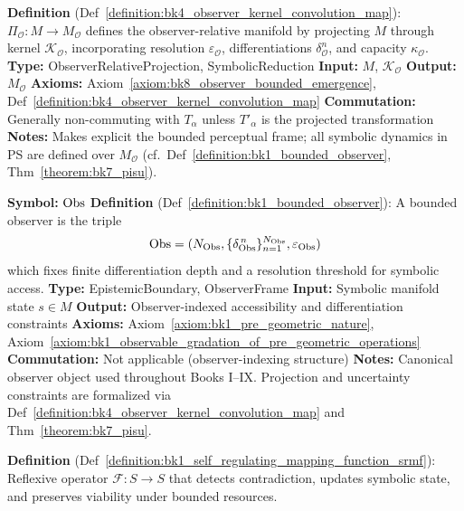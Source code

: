 \begin{description}[leftmargin=2.5cm, style=nextline]
\item[\textbf{Observer Kernel Projection} \hfill \ensuremath{\Pi_{\mathcal{O}}}] 
\label{dict:appA_observer_kernel_projection}
\textbf{Definition} (Def~\ref{definition:bk4_observer_kernel_convolution_map}): \( \Pi_{\mathcal{O}} : M \rightarrow M_{\mathcal{O}} \) defines the observer-relative manifold by projecting \( M \) through kernel \( \mathcal{K}_{\mathcal{O}} \), incorporating resolution \( \varepsilon_{\mathcal{O}} \), differentiations \( \delta^n_{\mathcal{O}} \), and capacity \( \kappa_{\mathcal{O}} \).
\textbf{Type:} ObserverRelativeProjection, SymbolicReduction
\textbf{Input:} \( M \), \( \mathcal{K}_{\mathcal{O}} \)
\textbf{Output:} \( M_{\mathcal{O}} \)
\textbf{Axioms:} Axiom~\ref{axiom:bk8_observer_bounded_emergence}, Def~\ref{definition:bk4_observer_kernel_convolution_map}
\textbf{Commutation:} Generally non-commuting with \( T_\alpha \) unless \( T'_\alpha \) is the projected transformation
\textbf{Notes:} Makes explicit the bounded perceptual frame; all symbolic dynamics in PS are defined over \( M_{\mathcal{O}} \) (cf.~Def~\ref{definition:bk1_bounded_observer}, Thm~\ref{theorem:bk7_pisu}).

\item[\textbf{Bounded Observer}] 
\label{dict:appA_bounded_observer}
\textbf{Symbol:} \( \mathrm{Obs} \)
\textbf{Definition} (Def~\ref{definition:bk1_bounded_observer}): A bounded
observer is the triple
\[
\mathrm{Obs} = (N_{\mathrm{Obs}}, \{\delta_{\mathrm{Obs}}^{\,n}\}_{n=1}^{N_{\mathrm{Obs}}}, \varepsilon_{\mathrm{Obs}})
\]
which fixes finite differentiation depth and a resolution threshold for
symbolic access.
\textbf{Type:} EpistemicBoundary, ObserverFrame
\textbf{Input:} Symbolic manifold state \( s \in M \)
\textbf{Output:} Observer-indexed accessibility and differentiation constraints
\textbf{Axioms:}
Axiom~\ref{axiom:bk1_pre_geometric_nature},
Axiom~\ref{axiom:bk1_observable_gradation_of_pre_geometric_operations}
\textbf{Commutation:} Not applicable (observer-indexing structure)
\textbf{Notes:} Canonical observer object used throughout Books I--IX.
Projection and uncertainty constraints are formalized via
Def~\ref{definition:bk4_observer_kernel_convolution_map} and
Thm~\ref{theorem:bk7_pisu}.

\item[\textbf{Self-Regulating Mapping Function} \hfill \ensuremath{\mathrm{SRMF}}] 
\label{dict:appA_self_regulating_mapping_function}
\textbf{Definition} (Def~\ref{definition:bk1_self_regulating_mapping_function_srmf}): Reflexive operator \( \mathcal{F}: S \to S \) that detects contradiction, updates symbolic state, and preserves viability under bounded resources.


\end{description}
